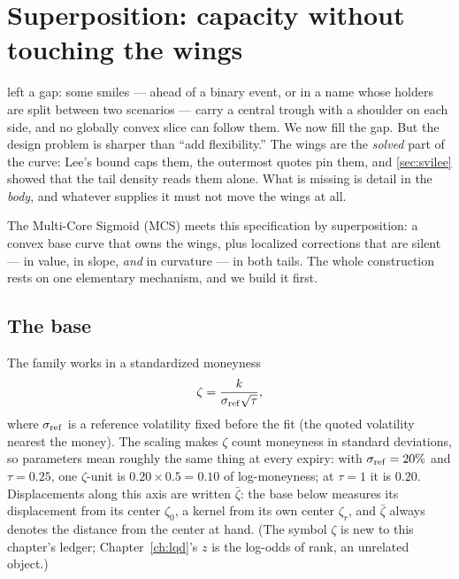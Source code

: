 \section{Superposition: capacity without touching the wings}
\label{sec:mcs}

 left a gap: some smiles --- ahead of a binary
event, or in a name whose holders are split between two scenarios ---
carry a central trough with a shoulder on each side, and no globally
convex slice can follow them.  We now fill the gap.  But the design
problem is sharper than ``add flexibility.''  The wings are the
\emph{solved} part of the curve: Lee's bound caps them, the outermost
quotes pin them, and \cref{sec:svilee} showed that the tail density
reads them alone.  What is missing is detail in the \emph{body}, and
whatever supplies it must not move the wings at all.

The Multi-Core Sigmoid (MCS) meets this specification by
superposition: a convex base curve that owns the wings, plus localized
corrections that are silent --- in value, in slope, \emph{and} in
curvature --- in both tails.  The whole construction rests on one
elementary mechanism, and we build it first.

\subsection{The base}

The family works in a standardized moneyness
\begin{equation}
\zeta=\frac{k}{\sigma_{\rm ref}\sqrt\tau},
\label{eq:zetadef}
\end{equation}
where $\sigma_{\rm ref}$ is a reference volatility fixed before the fit
(the quoted volatility nearest the money).  The scaling makes $\zeta$
count moneyness in standard deviations, so parameters mean roughly the
same thing at every expiry: with $\sigma_{\rm ref}=20\%$ and
$\tau=0.25$, one $\zeta$-unit is $0.20\times0.5=0.10$ of
log-moneyness; at $\tau=1$ it is $0.20$.  Displacements along this
axis are written $\bar\zeta$: the base below measures its displacement
from its center $\zeta_0$, a kernel from its own center $\zeta_r$, and
$\bar\zeta$ always denotes the distance from the center at hand.  (The
symbol $\zeta$ is new to this chapter's ledger;
Chapter~\ref{ch:lqd}'s $z$ is the log-odds of rank, an unrelated
object.)

